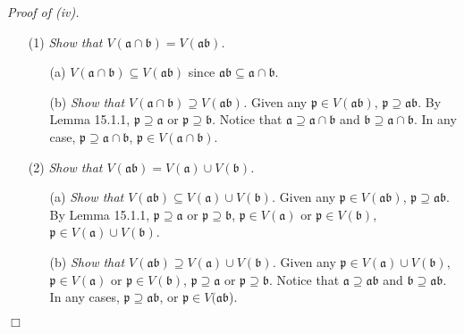 \documentclass{article}
\begin{document}
\emph{Proof of (iv).}
\begin{enumerate}
\item[(1)]
\emph{Show that $V(\mathfrak{a} \cap \mathfrak{b}) = V(\mathfrak{a} \mathfrak{b})$.}
  \begin{enumerate}
  \item[(a)]
    \emph{$V(\mathfrak{a} \cap \mathfrak{b}) \subseteq V(\mathfrak{a} \mathfrak{b})$}
    since $\mathfrak{a} \mathfrak{b} \subseteq \mathfrak{a} \cap \mathfrak{b}$.

  \item[(b)]
    \emph{Show that $V(\mathfrak{a} \cap \mathfrak{b}) \supseteq V(\mathfrak{a} \mathfrak{b})$.}
    Given any $\mathfrak{p} \in V(\mathfrak{a} \mathfrak{b})$,
    $\mathfrak{p} \supseteq \mathfrak{a} \mathfrak{b}$.
    By Lemma 15.1.1, $\mathfrak{p} \supseteq \mathfrak{a}$ or $\mathfrak{p} \supseteq \mathfrak{b}$.
    Notice that $\mathfrak{a} \supseteq \mathfrak{a \cap b}$
    and $\mathfrak{b} \supseteq \mathfrak{a \cap b}$.
    In any case, $\mathfrak{p} \supseteq \mathfrak{a \cap b}$,
    $\mathfrak{p} \in V(\mathfrak{a} \cap \mathfrak{b})$.
  \end{enumerate}

\item[(2)]
\emph{Show that $V(\mathfrak{a} \mathfrak{b}) = V(\mathfrak{a}) \cup V(\mathfrak{b})$.}
  \begin{enumerate}
  \item[(a)]
    \emph{Show that $V(\mathfrak{a} \mathfrak{b})
    \subseteq V(\mathfrak{a}) \cup V(\mathfrak{b})$.}
    Given any $\mathfrak{p} \in V(\mathfrak{a} \mathfrak{b})$,
    $\mathfrak{p} \supseteq \mathfrak{a} \mathfrak{b}$.
    By Lemma 15.1.1,
    $\mathfrak{p} \supseteq \mathfrak{a}$ or $\mathfrak{p} \supseteq \mathfrak{b}$,
    $\mathfrak{p} \in V(\mathfrak{a})$ or $\mathfrak{p} \in V(\mathfrak{b})$,
    $\mathfrak{p} \in V(\mathfrak{a}) \cup V(\mathfrak{b})$.

  \item[(b)]
    \emph{Show that $V(\mathfrak{a} \mathfrak{b})
    \supseteq V(\mathfrak{a}) \cup V(\mathfrak{b})$.}
    Given any $\mathfrak{p} \in V(\mathfrak{a}) \cup V(\mathfrak{b})$,
    $\mathfrak{p} \in V(\mathfrak{a})$ or $\mathfrak{p} \in V(\mathfrak{b})$,
    $\mathfrak{p} \supseteq \mathfrak{a}$ or $\mathfrak{p} \supseteq \mathfrak{b}$.
    Notice that $\mathfrak{a} \supseteq \mathfrak{ab}$
    and $\mathfrak{b} \supseteq \mathfrak{ab}$.
    In any cases, $\mathfrak{p} \supseteq \mathfrak{ab}$,
    or $\mathfrak{p} \in V(\mathfrak{ab}$).
  \end{enumerate}
\end{enumerate}
$\Box$ \\\\
\end{document}
